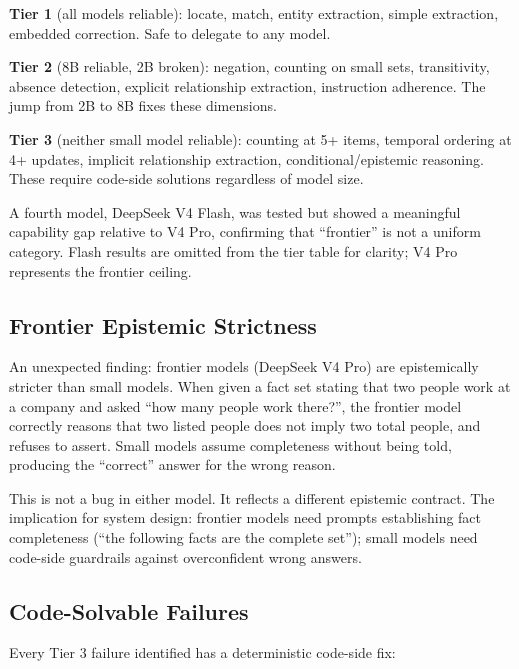 \documentclass[11pt,a4paper]{article}
\begin{document}
\textbf{Tier 1} (all models reliable): locate, match, entity extraction, simple extraction, embedded correction. Safe to delegate to any model.

\textbf{Tier 2} (8B reliable, 2B broken): negation, counting on small sets, transitivity, absence detection, explicit relationship extraction, instruction adherence. The jump from 2B to 8B fixes these dimensions.

\textbf{Tier 3} (neither small model reliable): counting at 5+ items, temporal ordering at 4+ updates, implicit relationship extraction, conditional/epistemic reasoning. These require code-side solutions regardless of model size.

A fourth model, DeepSeek V4 Flash, was tested but showed a meaningful capability gap relative to V4 Pro, confirming that ``frontier'' is not a uniform category. Flash results are omitted from the tier table for clarity; V4 Pro represents the frontier ceiling.

\subsection{Frontier Epistemic Strictness}

An unexpected finding: frontier models (DeepSeek V4 Pro) are epistemically stricter than small models. When given a fact set stating that two people work at a company and asked ``how many people work there?'', the frontier model correctly reasons that two listed people does not imply two total people, and refuses to assert. Small models assume completeness without being told, producing the ``correct'' answer for the wrong reason.

This is not a bug in either model. It reflects a different epistemic contract. The implication for system design: frontier models need prompts establishing fact completeness (``the following facts are the complete set''); small models need code-side guardrails against overconfident wrong answers.

\subsection{Code-Solvable Failures}

Every Tier 3 failure identified has a deterministic code-side fix:
\end{document}
